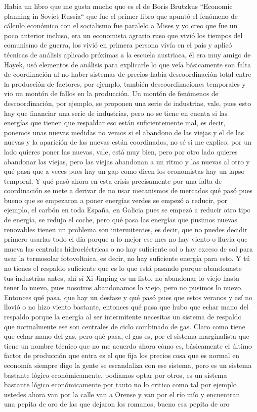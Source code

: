 Había un libro que me gusta mucho que es el de Boris Brutzkus ``Economic planning in Soviet Russia``\cite{brutzkus1982economic} que fue el primer libro que apuntó el fenómeno de cálculo económico con el socialismo fue paralelo a Mises y yo creo que fue un poco anterior incluso, era un economista agrario ruso que vivió los tiempos del comunismo de guerra, los vivió en primera persona vivía en el país y aplicó técnicas de análisis aplicado próximas a la escuela austriaca, él era muy amigo de Hayek, usó elementos de análisis para explicarle lo que veía básicamente son falta de coordinación al no haber sistemas de precios había descoordinación total entre la producción de factores, por ejemplo, también descoordinaciones temporales y vio un montón de fallos en la producción. Un montón de fenómenos de descoordinación, por ejemplo, se proponen una serie de industrias, vale, pues esto hay que financiar una serie de industrias, pero no se tiene en cuenta si las energías que tienen que respaldar eso están suficientemente mal, es decir, ponemos unas nuevas medidas no vemos si el abandono de las viejas y el de las nuevas y la aparición de las nuevas están coordinados, no sé si me explico, por un lado quieres poner las nuevas, vale, está muy bien, pero por otro lado quieres abandonar las viejas, pero las viejas abandonan a un ritmo y las nuevas al otro y qué pasa que a veces pues hay un gap como dicen los economistas hay un lapso temporal. Y qué pasó ahora en esta crisis precisamente por una falta de coordinación se mete a derivar de no usar mecanismos de mercados qué pasó pues bueno que se empezaron a poner energías verdes se empezó a reducir, por ejemplo, el carbón en toda España, en Galicia pues se empezó a reducir otro tipo de energía, se redujo el coche, pero qué pasa las energías que pusimos nuevas renovables tienen un problema son intermitentes, es decir, que no puedes decidir primero usarlas todo el día porque a lo mejor ese mes no hay viento o lluvia que mueva las centrales hidroeléctricas o no hay suficiente sol o hay exceso de sol para usar la termosolar fotovoltaica, es decir, no hay suficiente energía para esto. Y tú no tienes el respaldo suficiente que es lo que está pasando porque abandonaste tus industrias antes, ahí sí Xi Jinping es un listo, no abandonar lo viejo hasta tener lo nuevo, pues nosotros abandonamos lo viejo, pero no pusimos lo nuevo. Entonces qué pasa, que hay un desfase y qué pasó pues que estos veranos y así no llovió o no hizo viento bastante, entonces qué pasa que hubo que echar mano del respaldo porque la energía al ser intermitente necesitas un sistema de respaldo que normalmente ese son centrales de ciclo combinado de gas. Claro como tiene que echar mano del gas, pero qué pasa, el gas es, por el sistema marginalista que tiene un nombre técnico que no me acuerdo ahora cómo es, básicamente el último factor de producción que entra es el que fija los precios cosa que es normal en economía siempre digo la gente se escandaliza con ese sistema, pero es un sistema bastante lógico económicamente, podíamos optar por otros, es un sistema bastante lógico económicamente por tanto no lo critico como tal por ejemplo ustedes ahora van por la calle van a Orense y van por el río mío y encuentran una pepita de oro de las que dejaron los romanos, bueno esa pepita de oro 